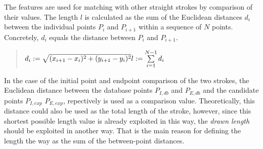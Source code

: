 The features are used for matching with other straight strokes by comparison
of their values. 
The length \(l\) is calculated as the sum of the Euclidean distances \(d_i\) 
between the individual points \(P_i\) and \(P_{i+1}\) within a sequence 
of \(N\) points. Concretely, \(d_i\) equals the distance between
\(P_i\) and \(P_{i+1}\).
\begin{quote}
\(
    d_i := \sqrt{(x_{i+1}-x_{i})^2+(y_{i+1}-y_{i})^2}\\
    l := \sum\limits_{i=1}^{N-1}{d_i}
\)
\end{quote}
In the case of the initial point and endpoint comparison of the two strokes, 
the Euclidean distance between the database points \(P_{I,db}\) and \(P_{E,db}\)
and the candidate points \(P_{I,exp}\) \(P_{E,exp}\), repectively is used as a 
comparison value. 
Theoretically, this distance could also be used as the total length
of the stroke, however, since this shortest possible length value is 
already exploited in this way, the \emph{drawn length} should be exploited 
in another way. That is the main reason for defining the length the way as
the sum of the between-point distances.

